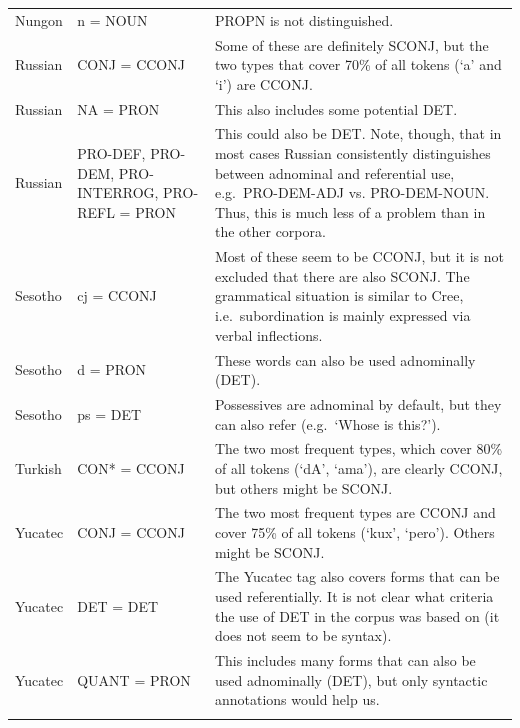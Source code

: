 \documentclass[a4paper, 11pt]{book}
\begin{document}
\begin{longtable}{lp{.2\linewidth}p{.5\linewidth}}
		Nungon                    & n = NOUN                  & PROPN is not distinguished. \\
		Russian                   & CONJ = CCONJ              & Some of these are definitely SCONJ, but the two types that cover 70\% of all tokens (`a' and `i') are CCONJ. \\
		Russian                   & NA = PRON                 & This also includes some potential DET. \\
		Russian                   & PRO-DEF, PRO-DEM, \hspace{2cm} PRO-INTERROG, PRO-REFL = PRON & This could also be DET. Note, though, that in most cases Russian consistently distinguishes between adnominal and referential use, e.g.\ PRO-DEM-ADJ vs. PRO-DEM-NOUN. Thus, this is much less of a problem than in the other corpora. \\
		Sesotho                   & cj = CCONJ                & Most of these seem to be CCONJ, but it is not excluded that there are also SCONJ. The grammatical situation is similar to Cree, i.e.\ subordination is mainly expressed via verbal inflections. \\
		Sesotho                   & d = PRON                  & These words can also be used adnominally (DET). \\
		Sesotho                   & ps = DET                  & Possessives are adnominal by default, but they can also refer (e.g.\ `Whose is this?'). \\
		Turkish                   & CON* = CCONJ              & The two most frequent types, which cover 80\% of all tokens (`dA', `ama'), are clearly CCONJ, but others might be SCONJ. \\
		Yucatec                   & CONJ = CCONJ              & The two most frequent types are CCONJ and cover 75\% of all tokens (`kux', `pero'). Others might be SCONJ. \\
		Yucatec                   & DET = DET                 & The Yucatec tag also covers forms that can be used referentially. It is not clear what criteria the use of DET in the corpus was based on (it does not seem to be syntax). \\
		Yucatec                   & QUANT = PRON              & This includes many forms that can also be used adnominally (DET), but only syntactic annotations would help us. \\
		\label{tab:mapping-raw-UD}
\end{longtable}
\end{document}
